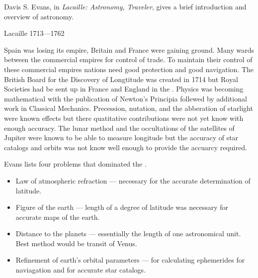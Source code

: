 Davis S. Evans, in \emph{Lacaille: Astronomy, Traveler}, \cite{evans:1992}
gives a brief introduction and overview of  astronomy.

Lacaille 1713---1762

Spain was losing its empire, Britain and France were gaining ground.
Many wards between the commercial empires for control of trade.  To
maintain their control of these commercial empires nations need good
protection and good navigation.  The British Board for the Discovery
of Longtitude was created in 1714 but Royal Societies had be sent up
in France and England in the .  Physics was becoming
mathematical with the publication of Newton's Principia follewed by
additional work in Classical Mechanics. Precession, nutation, and the
abberation of starlight were known effects but there quatitative
contributions were not yet know with enough accuracy.  The lunar
method and the occultations of the satellites of Jupiter were known
to be able to measure longitude but the accuracy of star catalogs and
orbits was not know well enough to provide the accuarcy required.

Evans lists four problems that dominated the .

\begin{itemize}

\item Law of atmospheric refraction --- necessary for the accurate
  determination of latitude.

\item Figure of the earth --- length of a degree of latitude was necessary
  for accurate maps of the earth.

\item Distance to the planets --- essentially the length of one
  astronomical unit.  Best method would be transit of Venus.

\item Refinement of earth's orbital parameters --- for calculating
ephemerides for naviagation and for accurate star catalogs.

\end{itemize}

